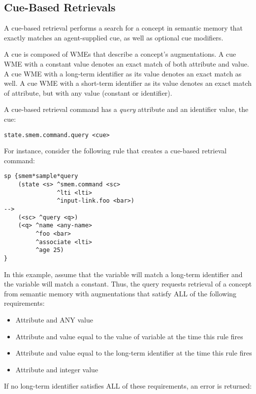 \subsection{Cue-Based Retrievals}
A cue-based retrieval performs a search for a concept in semantic memory that exactly matches an agent-supplied cue, as well as optional cue modifiers.

A cue is composed of WMEs that describe a concept's augmentations.  A cue WME with a constant value denotes an exact match of both attribute and value.  A cue WME with a long-term identifier as its value denotes an exact match as well.  A cue WME with a short-term identifier as its value denotes an exact match of attribute, but with any value (constant or identifier).  

A cue-based retrieval command has a \emph{query} attribute and an identifier value, the cue:

\begin{verbatim}
state.smem.command.query <cue>
\end{verbatim}

For instance, consider the following rule that creates a cue-based retrieval command:

\begin{verbatim}
sp {smem*sample*query
    (state <s> ^smem.command <sc>
               ^lti <lti>
               ^input-link.foo <bar>)
-->
    (<sc> ^query <q>)
    (<q> ^name <any-name>
         ^foo <bar>
         ^associate <lti>
         ^age 25)
}
\end{verbatim}

In this example, assume that the  variable will match a long-term identifier and the  variable will match a constant.  Thus, the query requests retrieval of a concept from semantic memory with augmentations that satisfy ALL of the following requirements:

\begin{itemize}
\item Attribute  and ANY value
\item Attribute  and value equal to the value of variable  at the time this rule fires
\item Attribute  and value equal to the long-term identifier  at the time this rule fires
\item Attribute  and integer value 
\end{itemize}

If no long-term identifier satisfies ALL of these requirements, an error is returned:

